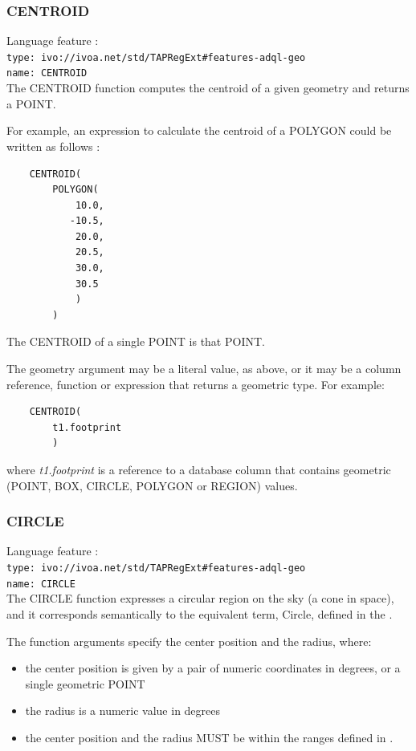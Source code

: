\documentclass[11pt,a4paper]{ivoa}
\begin{document}
\subsubsection{CENTROID}
\label{sec:functions.geom.centroid}
{\footnotesize Language feature :}\\
{\footnotesize \verb|type: ivo://ivoa.net/std/TAPRegExt#features-adql-geo|}\\
{\footnotesize \verb|name: CENTROID|}\\

The CENTROID function computes the centroid of a given geometry and returns a POINT.

For example, an expression to calculate the centroid of a POLYGON could
be written as follows :
\begin{verbatim}
    CENTROID(
        POLYGON(
            10.0,
           -10.5,
            20.0,
            20.5,
            30.0,
            30.5
            )
        )
\end{verbatim}

The CENTROID of a single POINT is that POINT.

The geometry argument may be a literal value, as above, or it may be a
column reference, function or expression that returns a geometric type.
For example:
\begin{verbatim}
    CENTROID(
        t1.footprint
        )
\end{verbatim}
where \textit{t1.footprint} is a reference to a database column that
contains geometric (POINT, BOX, CIRCLE, POLYGON or REGION) values.

\subsubsection{CIRCLE}
\label{sec:functions.geom.circle}
{\footnotesize Language feature :}\\
{\footnotesize \verb|type: ivo://ivoa.net/std/TAPRegExt#features-adql-geo|}\\
{\footnotesize \verb|name: CIRCLE|}\\

The CIRCLE function expresses a circular region on the sky (a cone in space),
and it corresponds semantically to the equivalent term, Circle, defined in
the \STCSpec.

The function arguments specify the center position and the radius, where:
\begin{itemize}
    \item the center position is given by a pair of numeric coordinates
    in degrees, or a single geometric POINT
    \item the radius is a numeric value in degrees
    \item the center position and the radius MUST be within the ranges defined in
    .
\end{itemize}
\end{document}
